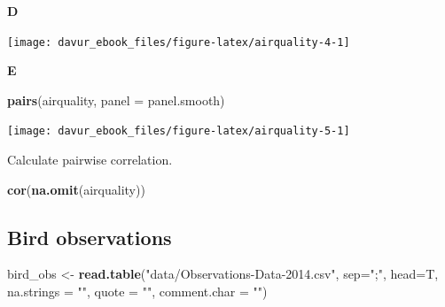 \documentclass[]{book}
\newenvironment{Shaded}{\begin{snugshade}}{\end{snugshade}}
\newcommand{\DataTypeTok}[1]{\textcolor[rgb]{0.13,0.29,0.53}{#1}}
\newcommand{\DecValTok}[1]{\textcolor[rgb]{0.00,0.00,0.81}{#1}}
\newcommand{\KeywordTok}[1]{\textcolor[rgb]{0.13,0.29,0.53}{\textbf{#1}}}
\newcommand{\NormalTok}[1]{#1}
\newcommand{\OperatorTok}[1]{\textcolor[rgb]{0.81,0.36,0.00}{\textbf{#1}}}
\newcommand{\StringTok}[1]{\textcolor[rgb]{0.31,0.60,0.02}{#1}}
\begin{document}
\textbf{D}

\begin{Shaded}
\end{Shaded}

\begin{center}\texttt{[image: davur\_ebook\_files/figure-latex/airquality-4-1]} \end{center}

\textbf{E}

\begin{Shaded}
\begin{Highlighting}[]
\KeywordTok{pairs}\NormalTok{(airquality, }\DataTypeTok{panel =}\NormalTok{ panel.smooth)}
\end{Highlighting}
\end{Shaded}

\begin{center}\texttt{[image: davur\_ebook\_files/figure-latex/airquality-5-1]} \end{center}

Calculate pairwise correlation.

\begin{Shaded}
\begin{Highlighting}[]
\KeywordTok{cor}\NormalTok{(}\KeywordTok{na.omit}\NormalTok{(airquality))}
\end{Highlighting}
\end{Shaded}

\hypertarget{bird-observations-1}{%
\subsection{Bird observations}\label{bird-observations-1}}

\begin{Shaded}
\begin{Highlighting}[]
\NormalTok{bird_obs <-}\StringTok{ }\KeywordTok{read.table}\NormalTok{(}\StringTok{"data/Observations-Data-2014.csv"}\NormalTok{, }
                                             \DataTypeTok{sep=}\StringTok{";"}\NormalTok{, }
                                             \DataTypeTok{head=}\NormalTok{T, }
                                             \DataTypeTok{na.strings =} \StringTok{""}\NormalTok{, }
                                             \DataTypeTok{quote =} \StringTok{""}\NormalTok{, }
                                             \DataTypeTok{comment.char =} \StringTok{""}\NormalTok{)}
\end{Highlighting}
\end{Shaded}
\end{document}
